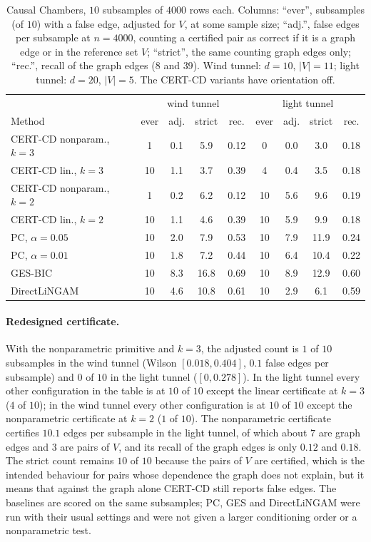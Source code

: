 \begin{table}[t]
\caption{Causal Chambers, $10$ subsamples of $4000$ rows each. Columns: ``ever'', subsamples (of $10$) with a false edge,
adjusted for $V$, at some sample size; ``adj.'', false edges per subsample at
$n=4000$, counting a certified pair as correct if it is a graph edge or in the
reference set $V$; ``strict'', the same counting graph edges only; ``rec.'', recall of the graph edges ($8$ and $39$). Wind tunnel: $d=10$, $|V|=11$;
light tunnel: $d=20$, $|V|=5$. The CERT-CD variants have orientation off.}
\label{tab:chamber}
\small
\setlength{\tabcolsep}{3pt}
\scriptsize\setlength{\tabcolsep}{2pt}
\begin{tabular}{@{}lcccccccc@{}}
\toprule
 & \multicolumn{4}{c}{wind tunnel} & \multicolumn{4}{c}{light tunnel}\\
Method & ever & adj. & strict & rec. & ever & adj. & strict & rec.\\
\midrule
CERT-CD nonparam., $k=3$ & 1 & 0.1 & 5.9 & 0.12 & 0 & 0.0 & 3.0 & 0.18\\
CERT-CD lin., $k=3$ & 10 & 1.1 & 3.7 & 0.39 & 4 & 0.4 & 3.5 & 0.18\\
CERT-CD nonparam., $k=2$ & 1 & 0.2 & 6.2 & 0.12 & 10 & 5.6 & 9.6 & 0.19\\
CERT-CD lin., $k=2$ & 10 & 1.1 & 4.6 & 0.39 & 10 & 5.9 & 9.9 & 0.18\\
PC, $\alpha=0.05$ & 10 & 2.0 & 7.9 & 0.53 & 10 & 7.9 & 11.9 & 0.24\\
PC, $\alpha=0.01$ & 10 & 1.8 & 7.2 & 0.44 & 10 & 6.4 & 10.4 & 0.22\\
GES-BIC & 10 & 8.3 & 16.8 & 0.69 & 10 & 8.9 & 12.9 & 0.60\\
DirectLiNGAM & 10 & 4.6 & 10.8 & 0.61 & 10 & 2.9 & 6.1 & 0.59\\
\bottomrule
\end{tabular}
\end{table}

\paragraph{Redesigned certificate.} With the nonparametric primitive and
$k=3$, the adjusted count is $1$ of $10$ subsamples in the wind tunnel
(Wilson $[0.018,0.404]$, $0.1$ false edges per subsample) and $0$ of $10$ in the light tunnel
($[0,0.278]$). In the light tunnel every other configuration in the table is at
$10$ of $10$ except the linear certificate at $k=3$ ($4$ of $10$); in the wind tunnel
every other configuration is at $10$ of $10$ except the nonparametric certificate at
$k=2$ ($1$ of $10$). The nonparametric certificate
certifies $10.1$ edges per subsample in the light tunnel, of which about $7$ are graph edges and
$3$ are pairs of $V$, and its recall of the graph edges is only $0.12$ and
$0.18$. The strict count remains $10$ of $10$ because the pairs of $V$ are
certified, which is the intended behaviour for pairs whose dependence the
graph does not explain, but it means that against the graph alone CERT-CD still
reports false edges. The baselines are scored on the same subsamples; PC, GES and
DirectLiNGAM were run with their usual settings and were not given a larger
conditioning order or a nonparametric test.

